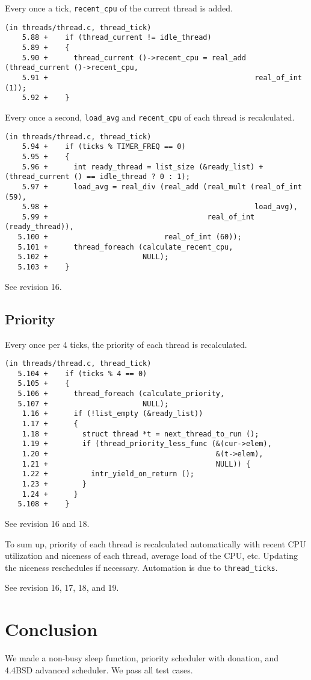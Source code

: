 \documentclass[a4paper,article,11pt,oneside]{article}
\begin{document}
Every once a tick, \texttt{recent\_cpu} of the current thread is
added.
\begin{verbatim}
(in threads/thread.c, thread_tick)
    5.88 +    if (thread_current != idle_thread)
    5.89 +    {
    5.90 +      thread_current ()->recent_cpu = real_add (thread_current ()->recent_cpu,
    5.91 +                                                real_of_int (1));
    5.92 +    }
\end{verbatim}

Every once a second, \texttt{load\_avg} and \texttt{recent\_cpu} of each
thread is recalculated.
\begin{verbatim}
(in threads/thread.c, thread_tick)
    5.94 +    if (ticks % TIMER_FREQ == 0)
    5.95 +    {
    5.96 +      int ready_thread = list_size (&ready_list) + (thread_current () == idle_thread ? 0 : 1);
    5.97 +      load_avg = real_div (real_add (real_mult (real_of_int (59),
    5.98 +                                                load_avg),
    5.99 +                                     real_of_int (ready_thread)),
   5.100 +                           real_of_int (60));
   5.101 +      thread_foreach (calculate_recent_cpu,
   5.102 +                      NULL);
   5.103 +    }
\end{verbatim}

See revision 16.

\subsection{Priority}
Every once per 4 ticks, the priority of each thread is recalculated.
\begin{verbatim}
(in threads/thread.c, thread_tick)
   5.104 +    if (ticks % 4 == 0)
   5.105 +    {
   5.106 +      thread_foreach (calculate_priority,
   5.107 +                      NULL);
    1.16 +      if (!list_empty (&ready_list))
    1.17 +      {
    1.18 +        struct thread *t = next_thread_to_run ();
    1.19 +        if (thread_priority_less_func (&(cur->elem),
    1.20 +                                       &(t->elem),
    1.21 +                                       NULL)) {
    1.22 +          intr_yield_on_return ();
    1.23 +        }            
    1.24 +      }
   5.108 +    }
\end{verbatim}

See revision 16 and 18.

To sum up, priority of each thread is recalculated automatically with
recent CPU utilization and niceness of each thread, average load of
the CPU, etc. Updating the niceness reschedules if
necessary. Automation is due to \texttt{thread\_ticks}.

See revision 16, 17, 18, and 19.

\section{Conclusion}\label{secconclusion}
We made a non-busy sleep function, priority scheduler with donation,
and 4.4BSD advanced scheduler. We pass all test cases.
\end{document}
